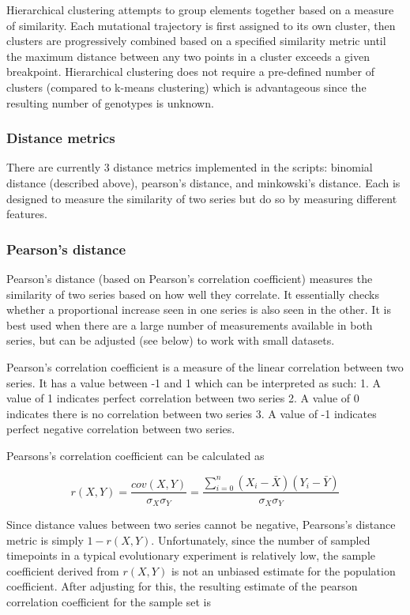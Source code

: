 \documentclass{report}
\begin{document}
Hierarchical clustering attempts to group elements together based on a measure of similarity. Each mutational trajectory is first assigned to its own cluster, then clusters are progressively combined based on a specified similarity metric until the maximum distance between any two points in a cluster exceeds a given breakpoint. Hierarchical clustering does not require a pre-defined number of clusters (compared to k-means clustering) which is advantageous since the resulting number of genotypes is unknown.

\subsubsection{Distance metrics}
There are currently 3 distance metrics implemented in the scripts: binomial distance (described above), pearson's distance, and minkowski's distance. Each is designed to measure the similarity of two series but do so by measuring different features.


\subsubsection{Pearson's distance}
Pearson's distance (based on Pearson's correlation coefficient) measures the similarity of two series based on how well they correlate. It essentially checks whether a proportional increase seen in one series is also seen in the other. It is best used when there are a large number of measurements available in both series, but can be adjusted (see below) to work with small datasets.

Pearson's correlation coefficient is a measure of the linear correlation between two series.
It has a value between -1 and 1 which can be interpreted as such:
  1. A value of 1 indicates perfect correlation between two series
  2. A value of 0 indicates there is no correlation between two series
  3. A value of -1 indicates perfect negative correlation between two series.

Pearsons's correlation coefficient can be calculated as

$$
r(X,Y) = \frac{cov(X,Y)}{\sigma_X \sigma_Y} =
\frac{\sum_{i=0}^n (X_i-\bar{X})(Y_i-\bar{Y})}{\sigma_X \sigma_Y}
$$

Since distance values between two series cannot be negative, Pearsons's distance metric is simply $1-r(X,Y)$. Unfortunately, since the number of sampled timepoints in a typical evolutionary experiment is relatively low, the sample coefficient derived from $r(X,Y)$ is not an unbiased estimate for the population coefficient. After adjusting for this, the resulting estimate of the pearson correlation coefficient for the sample set is
\end{document}
